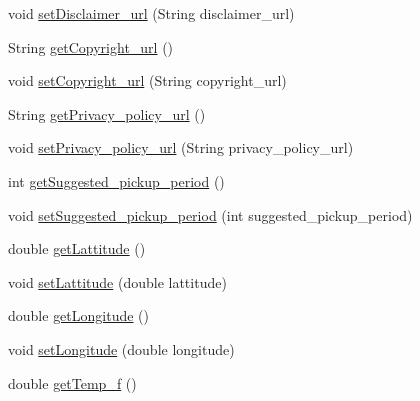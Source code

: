\begin{DoxyCompactItemize}
\item 
void \hyperlink{classgov_1_1fnal_1_1ppd_1_1dd_1_1testing_1_1news_1_1current__observation_a8019cbbe5bd9bfe3449a4b2d8a4df82e}{set\-Disclaimer\-\_\-url} (String disclaimer\-\_\-url)
\item 
String \hyperlink{classgov_1_1fnal_1_1ppd_1_1dd_1_1testing_1_1news_1_1current__observation_a78cb488851e66f874a4d2f6649af6c1e}{get\-Copyright\-\_\-url} ()
\item 
void \hyperlink{classgov_1_1fnal_1_1ppd_1_1dd_1_1testing_1_1news_1_1current__observation_a3967fc045b9a12709bb4cf199d9d3596}{set\-Copyright\-\_\-url} (String copyright\-\_\-url)
\item 
String \hyperlink{classgov_1_1fnal_1_1ppd_1_1dd_1_1testing_1_1news_1_1current__observation_ac414862a9e20b56ee1e5a9c686884ab8}{get\-Privacy\-\_\-policy\-\_\-url} ()
\item 
void \hyperlink{classgov_1_1fnal_1_1ppd_1_1dd_1_1testing_1_1news_1_1current__observation_a7db93aeb3295d4e6bffd3c7576e27f52}{set\-Privacy\-\_\-policy\-\_\-url} (String privacy\-\_\-policy\-\_\-url)
\item 
int \hyperlink{classgov_1_1fnal_1_1ppd_1_1dd_1_1testing_1_1news_1_1current__observation_a75fdadad20e42e5ac87581b5aed30bd4}{get\-Suggested\-\_\-pickup\-\_\-period} ()
\item 
void \hyperlink{classgov_1_1fnal_1_1ppd_1_1dd_1_1testing_1_1news_1_1current__observation_a5803799b5384e373a1c249e7c4f170d9}{set\-Suggested\-\_\-pickup\-\_\-period} (int suggested\-\_\-pickup\-\_\-period)
\item 
double \hyperlink{classgov_1_1fnal_1_1ppd_1_1dd_1_1testing_1_1news_1_1current__observation_a10f9382f04aa1841ad00025229fcd4ad}{get\-Lattitude} ()
\item 
void \hyperlink{classgov_1_1fnal_1_1ppd_1_1dd_1_1testing_1_1news_1_1current__observation_a267c328f55693e3a1e6fa4578913006b}{set\-Lattitude} (double lattitude)
\item 
double \hyperlink{classgov_1_1fnal_1_1ppd_1_1dd_1_1testing_1_1news_1_1current__observation_aab1850d3224e570b754523dbce7926ba}{get\-Longitude} ()
\item 
void \hyperlink{classgov_1_1fnal_1_1ppd_1_1dd_1_1testing_1_1news_1_1current__observation_a5bc3c7d8bf0df3ebb54e6208af7cd471}{set\-Longitude} (double longitude)
\item 
double \hyperlink{classgov_1_1fnal_1_1ppd_1_1dd_1_1testing_1_1news_1_1current__observation_a2e6d60395f445c47a12677a72bb3f564}{get\-Temp\-\_\-f} ()
\item 

\end{DoxyCompactItemize}
